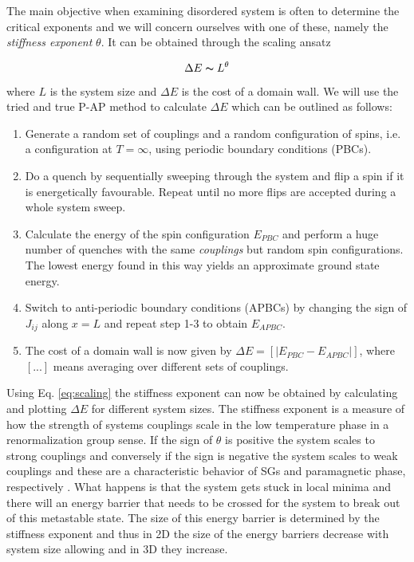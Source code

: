 \documentclass[paper=a4, fontsize=11pt]{scrartcl} %
\numberwithin{equation}{section} %
\numberwithin{figure}{section} %
\numberwithin{table}{section} %
\newcommand{\commutator}[1]{\ensuremath{\left[ #1 \right]}}
\begin{document}
The main objective when examining disordered system is often to determine the critical exponents and we will concern ourselves with one of these, namely the \emph{stiffness exponent} $\theta$. It can be obtained through the scaling ansatz

\begin{equation}
\Delta E \thicksim L^\theta
\label{eq:scaling}
\end{equation}
where $L$ is the system size and $\Delta E$ is the cost of a domain wall. We will use the tried and true P-AP method\cite{hartmann}\cite{carter} to calculate $\Delta E$ which can be outlined as follows:

\begin{enumerate}
\item Generate a random set of couplings and a random configuration of spins, i.e. a configuration at $T=\infty$, using periodic boundary conditions (PBCs).
\item Do a quench by sequentially sweeping through the system and flip a spin if it is energetically favourable. Repeat until no more flips are accepted during a whole system sweep.
\item Calculate the energy of the spin configuration $E_{PBC}$ and perform a huge number of quenches with the same \emph{couplings} but random spin configurations. The lowest energy found in this way yields an approximate ground state energy.
\item Switch to anti-periodic boundary conditions (APBCs) by changing the sign of $J_{ij}$ along $x=L$ and repeat step 1-3 to obtain $E_{APBC}$.
\item The cost of a domain wall is now given by $\Delta E = \commutator{|E_{PBC}-E_{APBC}|}$, where $[...]$ means averaging over different sets of couplings.
\end{enumerate}
Using Eq. \eqref{eq:scaling} the stiffness exponent can now be obtained by calculating and plotting $\Delta E$ for different system sizes. The stiffness exponent is a measure of how the strength of systems couplings scale in the low temperature phase in a renormalization group sense. If the sign of $\theta$ is positive the system scales to strong couplings and conversely if the sign is negative the system scales to weak couplings and these are a characteristic behavior of SGs and paramagnetic phase, respectively \cite{almeida}. What happens is that the system gets stuck in local minima and there will an energy barrier that needs to be crossed for the system to break out of this metastable state. The size of this energy barrier is determined by the stiffness exponent and thus in 2D the size of the energy barriers decrease with system size allowing and in 3D they increase.
\end{document}

